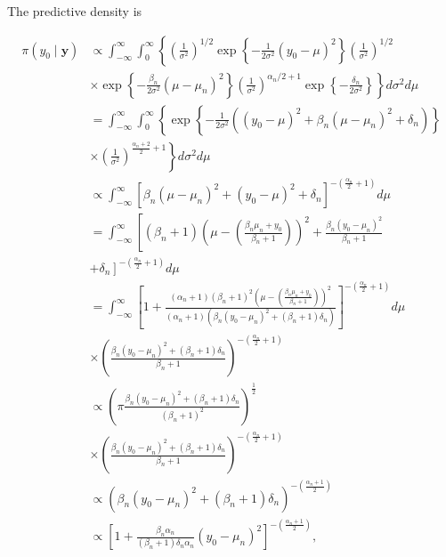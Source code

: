 \begin{enumerate}
The predictive density is

\begin{align}
	\pi(y_0\mid \bm{y})&\propto\int_{-\infty}^{\infty}\int_0^{\infty}\left\{ \left(\frac{1}{\sigma^2}\right)^{1/2}\exp\left\{-\frac{1}{2\sigma^2}(y_0-\mu)^2\right\}\left(\frac{1}{\sigma^2}\right)^{1/2}\right.\nonumber\\
	&\times \left.\exp\left\{-\frac{\beta_n}{2\sigma^2}(\mu-\mu_n)^2\right\}\left(\frac{1}{\sigma^2}\right)^{\alpha_n/2+1}\exp\left\{-\frac{\delta_n}{2\sigma^2}\right\}\right\}d\sigma^2d\mu\nonumber\\
	&=\int_{-\infty}^{\infty}\int_0^{\infty}\left\{ \exp\left\{-\frac{1}{2\sigma^2}((y_0-\mu)^2+\beta_n(\mu-\mu_n)^2+\delta_n)\right\}\right.\nonumber\\
	&\times \left.\left(\frac{1}{\sigma^2}\right)^{\frac{\alpha_n+2}{2}+1}\right\}d\sigma^2d\mu\nonumber\\
	&\propto\int_{-\infty}^{\infty}\left[\beta_n(\mu-\mu_n)^2+(y_0-\mu)^2+\delta_n\right]^{-\left(\frac{\alpha_n}{2}+1\right)}d\mu\nonumber\\
	&=\int_{-\infty}^{\infty}\left[(\beta_n+1)\left(\mu-\left(\frac{\beta_n\mu_n+y_0}{\beta_n+1}\right)\right)^2+\frac{\beta_n(y_0-\mu_n)^2}{\beta_n+1}\right.\nonumber\\
	&\left.+\delta_n\right]^{-\left(\frac{\alpha_n}{2}+1\right)}d\mu\nonumber\\
	&=\int_{-\infty}^{\infty}\left[1+\frac{(\alpha_n+1)(\beta_n+1)^2\left(\mu-\left(\frac{\beta_n\mu_n+y_0}{\beta_n+1}\right)\right)^2}{(\alpha_n+1)(\beta_n(y_0-\mu_n)^2+(\beta_n+1)\delta_n)}\right]^{-\left(\frac{\alpha_n}{2}+1\right)}d\mu\nonumber\\
	&\times\left(\frac{\beta_n(y_0-\mu_n)^2+(\beta_n+1)\delta_n}{\beta_n+1}\right)^{-\left(\frac{\alpha_n}{2}+1\right)}\nonumber\\
	&\propto\left(\pi\frac{\beta_n(y_0-\mu_n)^2+(\beta_n+1)\delta_n}{(\beta_n+1)^2}\right)^{\frac{1}{2}}\nonumber\\
	&\times\left(\frac{\beta_n(y_0-\mu_n)^2+(\beta_n+1)\delta_n}{\beta_n+1}\right)^{-\left(\frac{\alpha_n}{2}+1\right)}\nonumber\\
	&\propto (\beta_n(y_0-\mu_n)^2+(\beta_n+1)\delta_n)^{-\left(\frac{\alpha_n+1}{2}\right)}\nonumber\\
	&\propto\left[1+\frac{\beta_n\alpha_n}{(\beta_n+1)\delta_n\alpha_n}(y_0-\mu_n)^2\right]^{-\left(\frac{\alpha_n+1}{2}\right)},\nonumber
\end{align}


\end{enumerate}
